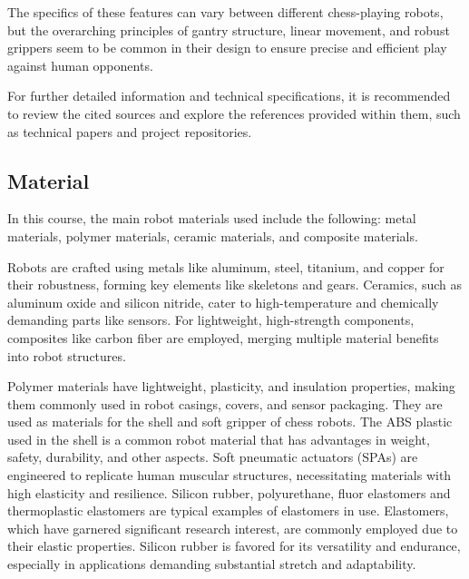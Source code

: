 \documentclass[10pt, a4paper, twocolumn]{article}
\begin{document}
The specifics of these features can vary between different chess-playing robots, but the overarching principles of gantry structure, linear movement, and robust grippers seem to be common in their design to ensure precise and efficient play against human opponents.

For further detailed information and technical specifications, it is recommended to review the cited sources and explore the references provided within them, such as technical papers and project repositories.

\subsection{Material}
In this course, the main robot materials used include the following: metal materials, polymer materials, ceramic materials, and composite materials.

Robots are crafted using metals like aluminum, steel, titanium, and copper for their robustness, forming key elements like skeletons and gears. Ceramics, such as aluminum oxide and silicon nitride, cater to high-temperature and chemically demanding parts like sensors. For lightweight, high-strength components, composites like carbon fiber are employed, merging multiple material benefits into robot structures.\cite{nelson_csc297_materials}

Polymer materials have lightweight, plasticity, and insulation properties, making them commonly used in robot casings, covers, and sensor packaging. They are used as materials for the shell and soft gripper of chess robots. The ABS plastic used in the shell is a common robot material that has advantages in weight, safety, durability, and other aspects. Soft pneumatic actuators (SPAs) are engineered to replicate human muscular structures, necessitating materials with high elasticity and resilience\cite{Rus2015}. Silicon rubber, polyurethane, fluor elastomers and thermoplastic elastomers are typical examples of elastomers in use.  Elastomers, which have garnered significant research interest\cite{Moseley2016}, are commonly employed due to their elastic properties. Silicon rubber is favored for its versatility and endurance, especially in applications demanding substantial stretch and adaptability\cite{Xavier2022}.
\end{document}
